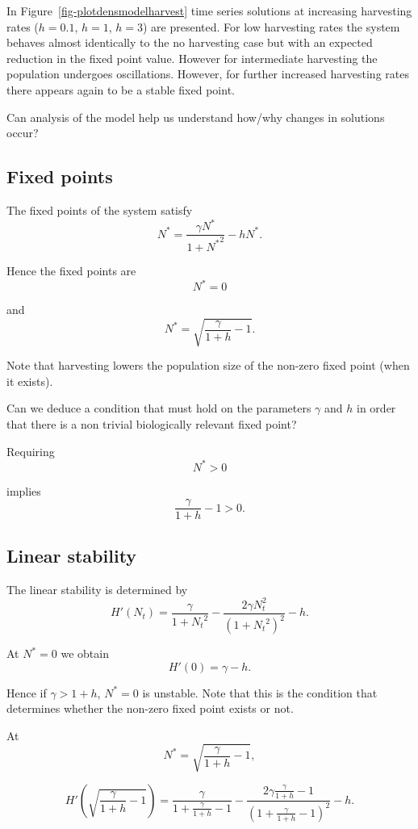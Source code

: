 \documentclass[
  letterpaper,
  DIV=11,
  numbers=noendperiod]{scrreprt}
\begin{document}
In Figure~\ref{fig-plotdensmodelharvest} time series solutions at
increasing harvesting rates (\(h=0.1\), \(h=1\), \(h=3\)) are presented.
For low harvesting rates the system behaves almost identically to the no
harvesting case but with an expected reduction in the fixed point value.
However for intermediate harvesting the population undergoes
oscillations. However, for further increased harvesting rates there
appears again to be a stable fixed point.

Can analysis of the model help us understand how/why changes in
solutions occur?

\hypertarget{fixed-points-2}{%
\subsection{Fixed points}\label{fixed-points-2}}

The fixed points of the system satisfy \[
N^*=\frac{\gamma N^*}{1+{N^*}^2} - h N^*.
\]

Hence the fixed points are \[
N^*=0
\]

and \[
N^*=\sqrt{\frac{\gamma}{1+h}-1}.
\]

Note that harvesting lowers the population size of the non-zero fixed
point (when it exists).

Can we deduce a condition that must hold on the parameters \(\gamma\)
and \(h\) in order that there is a non trivial biologically relevant
fixed point?

Requiring \[
N^* >0
\]

implies \[
\frac{\gamma}{1+h}-1>0.
\]

\hypertarget{linear-stability-1}{%
\subsection{Linear stability}\label{linear-stability-1}}

The linear stability is determined by \[
H'(N_t)=\frac{\gamma }{1+{N_t}^2} - \frac{2\gamma N_t^2 }{(1+{N_t}^2)^2} - h.
\]

At \(N^*=0\) we obtain \[
H'(0)=\gamma-h.
\]

Hence if \(\gamma>1+h\), \(N^*=0\) is unstable. Note that this is the
condition that determines whether the non-zero fixed point exists or
not.

At \[
N^*=\sqrt{\frac{\gamma}{1+h}-1},
\]

\[
H'\left(\sqrt{\frac{\gamma}{1+h}-1}\right)=\frac{\gamma }{1+\frac{\gamma}{1+h}-1} - \frac{2\gamma \frac{\gamma}{1+h}-1 }{(1+\frac{\gamma}{1+h}-1)^2} - h.
\]
\end{document}
